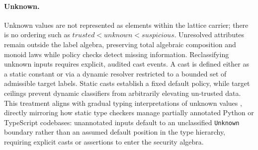 \paragraph{Unknown.}
Unknown values are not represented as elements within the lattice carrier; there is no ordering such as $\mathit{trusted} < \mathit{unknown} < \mathit{suspicious}$. Unresolved attributes remain outside the label algebra, preserving total algebraic composition and monoid laws while policy checks detect missing information. Reclassifying unknown inputs requires explicit, audited cast events. A cast is defined either as a static constant or via a dynamic resolver restricted to a bounded set of admissible target labels. Static casts establish a fixed default policy, while target ceilings prevent dynamic classifiers from arbitrarily elevating un-trusted data. This treatment aligns with gradual typing interpretations of unknown values \cite{disney2011gradual,fennell2013gradual}, directly mirroring how static type checkers manage partially annotated Python or TypeScript codebases: unannotated inputs default to an unclassified \texttt{Unknown} boundary rather than an assumed default position in the type hierarchy, requiring explicit casts or assertions to enter the security algebra.

